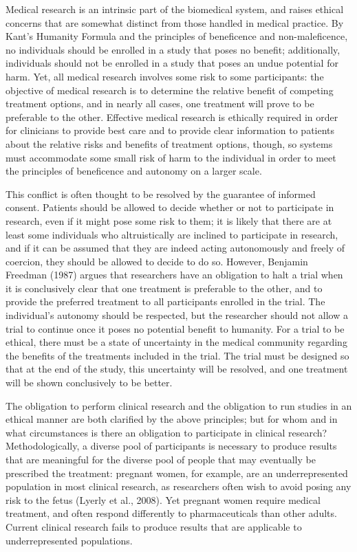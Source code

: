 \documentclass[]{spie}  %
\begin{document}
Medical research is an intrinsic part of the biomedical system, and raises ethical concerns that are somewhat distinct from those handled in medical practice. By Kant’s Humanity Formula and the principles of beneficence and non-maleficence, no individuals should be enrolled in a study that poses no benefit; additionally, individuals should not be enrolled in a study that poses an undue potential for harm. Yet, all medical research involves some risk to some participants: the objective of medical research is to determine the relative benefit of competing treatment options, and in nearly all cases, one treatment will prove to be preferable to the other. Effective medical research is ethically required in order for clinicians to provide best care and to provide clear information to patients about the relative risks and benefits of treatment options, though, so systems must accommodate some small risk of harm to the individual in order to meet the principles of beneficence and autonomy on a larger scale.

This conflict is often thought to be resolved by the guarantee of informed consent. Patients should be allowed to decide whether or not to participate in research, even if it might pose some risk to them; it is likely that there are at least some individuals who altruistically are inclined to participate in research, and if it can be assumed that they are indeed acting autonomously and freely of coercion, they should be allowed to decide to do so. However, Benjamin Freedman (1987) argues that researchers have an obligation to halt a trial when it is conclusively clear that one treatment is preferable to the other, and to provide the preferred treatment to all participants enrolled in the trial. The individual’s autonomy should be respected, but the researcher should not allow a trial to continue once it poses no potential benefit to humanity. For a trial to be ethical, there must be a state of uncertainty in the medical community regarding the benefits of the treatments included in the trial. The trial must be designed so that at the end of the study, this uncertainty will be resolved, and one treatment will be shown conclusively to be better.

The obligation to perform clinical research and the obligation to run studies in an ethical manner are both clarified by the above principles; but for whom and in what circumstances is there an obligation to participate in clinical research? Methodologically, a diverse pool of participants is necessary to produce results that are meaningful for the diverse pool of people that may eventually be prescribed the treatment: pregnant women, for example, are an underrepresented population in most clinical research, as researchers often wish to avoid posing any risk to the fetus (Lyerly et al., 2008). Yet pregnant women require medical treatment, and often respond differently to pharmaceuticals than other adults. Current clinical research fails to produce results that are applicable to underrepresented populations.
\end{document}
